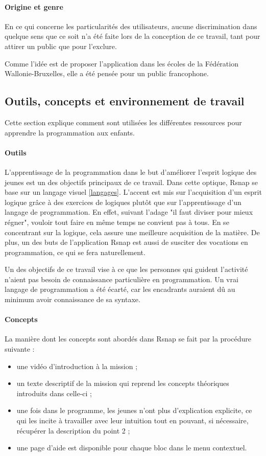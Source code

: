 \paragraph{Origine et genre}
En ce qui concerne les particularités des utilisateurs, aucune discrimination dans quelque sens que ce soit n'a été faite lors de la conception de ce travail, tant pour attirer un public que pour l'exclure. 

Comme l'idée est de proposer l'application dans les écoles de la Fédération Wallonie-Bruxelles, elle a été pensée pour un public francophone. 

\subsection{Outils, concepts et environnement de travail}
Cette section explique comment sont utilisées les différentes ressources pour apprendre la programmation aux enfants.

\paragraph{Outils}
\label{outil}
L'apprentissage de la programmation dans le but d'améliorer l'esprit logique des jeunes est un des objectifs principaux de ce travail. Dans cette optique, Rsnap se base sur un langage visuel \ref{langages}. L'accent est mis sur l'acquisition d'un esprit logique grâce à des exercices de logiques plutôt que sur l'apprentissage d'un langage de programmation.  En effet, suivant l'adage "il faut diviser pour mieux régner", vouloir tout faire en même temps ne convient pas à tous. En se concentrant sur la logique, cela assure une meilleure acquisition de la matière. De plus, un des buts de l'application Rsnap est aussi de susciter des vocations en programmation, ce qui se fera naturellement.

Un des objectifs de ce travail vise à ce que les personnes qui guident l'activité n'aient pas besoin de connaissance particulière en programmation. Un vrai langage de programmation a été écarté, car les encadrants auraient dû au minimum avoir connaissance de sa syntaxe.

\paragraph{Concepts}
La manière dont les concepts sont abordés dans Rsnap se fait par la procédure suivante :
\begin{itemize}
	\item une vidéo d'introduction à la mission ;
	\item un texte descriptif de la mission qui reprend les concepts théoriques introduits dans celle-ci ;
	\item une fois dans le programme, les jeunes n'ont plus d'explication explicite, ce qui les incite à travailler avec leur intuition tout en pouvant, si nécessaire, récupérer la description du point 2 ;
	\item une page d'aide est disponible pour chaque bloc dans le menu contextuel.
\end{itemize}

